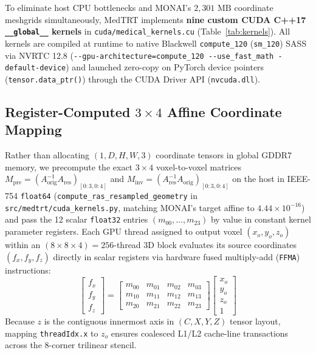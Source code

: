\documentclass[10pt,twocolumn]{article}
\begin{document}
To eliminate host CPU bottlenecks and MONAI's $2,301\text{ MB}$ coordinate meshgrids simultaneously, MedTRT implements \textbf{nine custom CUDA C++17 \texttt{\_\_global\_\_} kernels} in \texttt{cuda/medical\_kernels.cu} (Table~\ref{tab:kernels}). All kernels are compiled at runtime to native Blackwell \texttt{compute\_120} (\texttt{sm\_120}) SASS via NVRTC 12.8 (\texttt{-{}-gpu-architecture=compute\_120 -{}-use\_fast\_math -default-device}) and launched zero-copy on PyTorch device pointers (\texttt{tensor.data\_ptr()}) through the CUDA Driver API (\texttt{nvcuda.dll}).

\subsection{Register-Computed $3 \times 4$ Affine Coordinate Mapping}
Rather than allocating $(1, D, H, W, 3)$ coordinate tensors in global GDDR7 memory, we precompute the exact $3 \times 4$ voxel-to-voxel matrices $M_{\text{pre}} = (A_{\text{orig}}^{-1} A_{\text{res}})_{[0:3, 0:4]}$ and $M_{\text{inv}} = (A_{\text{res}}^{-1} A_{\text{orig}})_{[0:3, 0:4]}$ on the host in IEEE-754 \texttt{float64} (\texttt{compute\_ras\_resampled\_geometry} in \texttt{src/medtrt/cuda\_kernels.py}, matching MONAI's target affine to $4.44 \times 10^{-16}$) and pass the 12 scalar \texttt{float32} entries $(m_{00}, \dots, m_{23})$ by value in constant kernel parameter registers. Each GPU thread assigned to output voxel $(x_o, y_o, z_o)$ within an $(8 \times 8 \times 4) = 256$-thread 3D block evaluates its source coordinates $(f_x, f_y, f_z)$ directly in scalar registers via hardware fused multiply-add (\texttt{FFMA}) instructions:
\begin{equation}
\begin{bmatrix} f_x \\ f_y \\ f_z \end{bmatrix} =
\begin{bmatrix}
m_{00} & m_{01} & m_{02} & m_{03} \\
m_{10} & m_{11} & m_{12} & m_{13} \\
m_{20} & m_{21} & m_{22} & m_{23}
\end{bmatrix}
\begin{bmatrix} x_o \\ y_o \\ z_o \\ 1 \end{bmatrix}
\label{eq:reg_affine}
\end{equation}
Because $z$ is the contiguous innermost axis in $(C, X, Y, Z)$ tensor layout, mapping \texttt{threadIdx.x} to $z_o$ ensures coalesced L1/L2 cache-line transactions across the 8-corner trilinear stencil.
\end{document}
